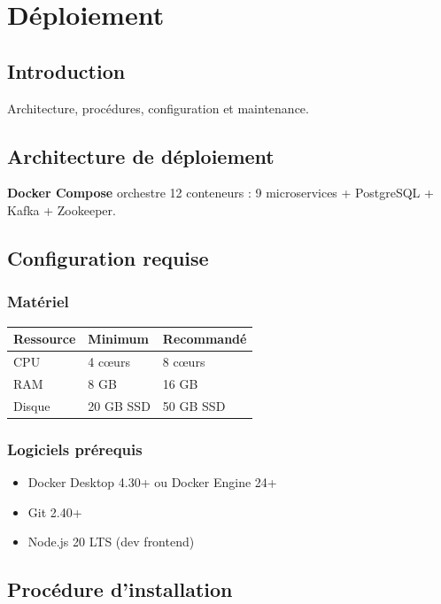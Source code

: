 \documentclass[12pt,a4paper,oneside]{report}
\begin{document}
\chapter{Déploiement}

\section{Introduction}
Architecture, procédures, configuration et maintenance.

\section{Architecture de déploiement}
\textbf{Docker Compose} orchestre 12 conteneurs : 9 microservices + PostgreSQL + Kafka + Zookeeper.

\section{Configuration requise}

\subsection{Matériel}
\begin{table}[H]
\centering
\begin{tabular}{lll}
\toprule
\textbf{Ressource} & \textbf{Minimum} & \textbf{Recommandé} \\
\midrule
CPU & 4 cœurs & 8 cœurs \\
RAM & 8 GB & 16 GB \\
Disque & 20 GB SSD & 50 GB SSD \\
\bottomrule
\end{tabular}
\end{table}

\subsection{Logiciels prérequis}
\begin{itemize}
    \item Docker Desktop 4.30+ ou Docker Engine 24+
    \item Git 2.40+
    \item Node.js 20 LTS (dev frontend)
\end{itemize}

\section{Procédure d'installation}
\end{document}
